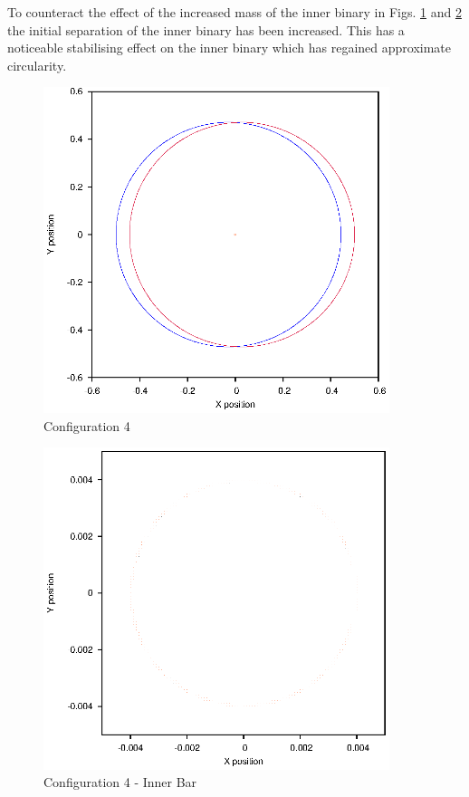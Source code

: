 \documentclass[a4paper,12pt]{article}
\begin{document}
To counteract the effect of the increased mass of the inner binary in Figs. \ref{fig:config4} and \ref{fig:config4i} the initial separation of the 
inner binary has been increased. This has a noticeable stabilising effect on the inner binary which has regained approximate circularity.
\begin{figure}[H]
\centering
\includegraphics[width=0.9\textwidth]{./2016results/004-5-004/Orbit.eps}
\caption{Configuration 4}
\label{fig:config4}
\end{figure}
\begin{figure}[H]
\centering
\includegraphics[width=0.9\textwidth]{./2016results/004-5-004/Inner.eps}
\caption{Configuration 4 - Inner Bar}
\label{fig:config4i}
\end{figure}
\end{document}
